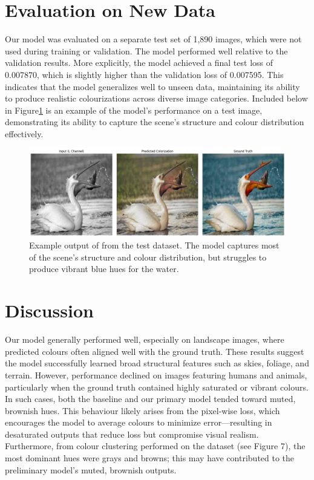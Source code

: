 \documentclass{article} %
\begin{document}
\section{Evaluation on New Data}
\label{new_data}

Our model was evaluated on a separate test set of 1,890 images, which were not used during training or validation. The model performed well relative to the validation results. More explicitly, the model achieved 
a final test loss of 0.007870, which is slightly higher than the validation loss of 0.007595. This indicates that the model generalizes well to unseen data, maintaining its ability to produce realistic colourizations across diverse image categories. 
Included below in Figure\ref{fig:test-data-example} is an example of the model's performance on a test image, demonstrating its ability to capture the scene's structure and colour distribution effectively.

\begin{figure}[htbp]            %
  \centering
  \includegraphics[width=0.9\linewidth]{Figs/test_data_result_example.png}
  \caption{Example output of from the test dataset. The model captures most of the scene's structure and colour distribution, but struggles to produce vibrant blue hues for the water.}
  \label{fig:test-data-example}
\end{figure}

\section{Discussion}
\label{discussion}

Our model generally performed well, especially on landscape images, where predicted colours often aligned well with the ground truth. These results suggest the model successfully
learned broad structural features such as skies, foliage, and terrain. However, performance declined on images featuring humans and animals, particularly when the ground truth
contained highly saturated or vibrant colours. In such cases, both the baseline and our primary model tended toward muted, brownish hues. This behaviour likely arises from the
pixel-wise loss, which encourages the model to average colours to minimize error—resulting in desaturated outputs that reduce loss but compromise visual realism. Furthermore, 
from colour clustering performed on the dataset (see Figure 7), the most dominant hues were grays and browns; this may have contributed to the preliminary model's muted, brownish outputs. 
\end{document}
